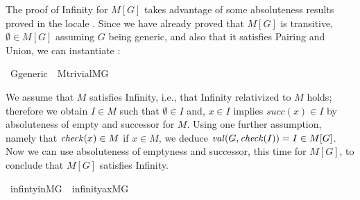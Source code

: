 The proof of Infinity for $M[G]$ takes advantage of some absoluteness
results proved in the locale . Since
we have already proved that $M[G]$ is transitive, $\emptyset\in M[G]$
assuming $G$ being generic, and also that it satisfies Pairing and
Union, we can instantiate :
\begin{isabelle}
\isamarkupfalse%
\ G{\isacharunderscore}generic\ {\isasymsubseteq}\ M{\isacharunderscore}trivial{\isachardoublequoteopen}{\isacharhash}{\isacharhash}M{\isacharbrackleft}G{\isacharbrackright}{\isachardoublequoteclose}
\end{isabelle}
We assume that $M$ satisfies Infinity, i.e., that Infinity
relativized to $M$ holds; therefore we
obtain $I \in M$ such that $\emptyset\in I$ and, $x \in I$ implies
$\mathit{succ}(x)\in I$  by absoluteness of empty and
successor for $M$. Using one further assumption, namely that
$\operatorname{\mathit{check}}(x) \in M$ if $x\in M$, we deduce $\operatorname{\mathit{val}}(G,\operatorname{\mathit{check}}(I)) = I \in M[G]$.
Now we can use absoluteness of emptyness and successor, this time for
$M[G]$, to conclude that $M[G]$ satisfies Infinity.
\begin{isabelle}
  \isamarkupfalse%
\ infinty{\isacharunderscore}in{\isacharunderscore}MG\ {\isacharcolon}\ {\isachardoublequoteopen}infinity{\isacharunderscore}ax{\isacharparenleft}{\isacharhash}{\isacharhash}M{\isacharbrackleft}G{\isacharbrackright}{\isacharparenright}{\isachardoublequoteclose}
\end{isabelle}
\noindent{}
\medskip


